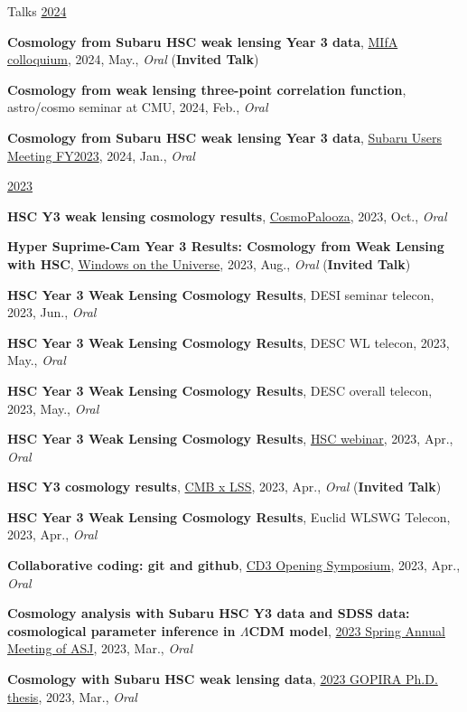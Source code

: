 \begin{rSection}{Talks}
\underline{2024}
\begin{etaremune}
\setcounter{enumi}{38}
\item \textbf{Cosmology from Subaru HSC weak lensing Year 3 data}, \href{https://cse.umn.edu/physics/minnesota-institute-astrophysics-mifa-colloquium}{MIfA colloquium}, 2024, May., \textit{Oral} (\textbf{Invited Talk})
\item \textbf{Cosmology from weak lensing three-point correlation function}, astro/cosmo seminar at CMU, 2024, Feb., \textit{Oral}
\item \textbf{Cosmology from Subaru HSC weak lensing Year 3 data}, \href{https://www.subarutelescope.org/Science/SubaruUM/SubaruUM2023/index.html}{Subaru Users Meeting FY2023}, 2024, Jan., \textit{Oral}
\end{etaremune}

\underline{2023}
\begin{etaremune}
\setcounter{enumi}{35}
\item \textbf{HSC Y3 weak lensing cosmology results}, \href{http://vietnam.in2p3.fr/2023/windows/index.html}{CosmoPalooza}, 2023, Oct., \textit{Oral}
\item \textbf{Hyper Suprime-Cam Year 3 Results: Cosmology from Weak Lensing with HSC}, \href{http://vietnam.in2p3.fr/2023/windows/index.html}{Windows on the Universe}, 2023, Aug., \textit{Oral} (\textbf{Invited Talk})
\item \textbf{HSC Year 3 Weak Lensing Cosmology Results}, DESI seminar telecon, 2023, Jun., \textit{Oral}
\item \textbf{HSC Year 3 Weak Lensing Cosmology Results}, DESC WL telecon, 2023, May., \textit{Oral}
\item \textbf{HSC Year 3 Weak Lensing Cosmology Results}, DESC overall telecon, 2023, May., \textit{Oral}
\item \textbf{HSC Year 3 Weak Lensing Cosmology Results}, \href{https://hsc-release.mtk.nao.ac.jp/doc/index.php/wly3/}{HSC webinar}, 2023, Apr., \textit{Oral}
\item \textbf{HSC Y3 cosmology results}, \href{https://www2.yukawa.kyoto-u.ac.jp/~cmb-lss/index.php}{CMB x LSS}, 2023, Apr., \textit{Oral} (\textbf{Invited Talk})
\item \textbf{HSC Year 3 Weak Lensing Cosmology Results}, Euclid WLSWG Telecon, 2023, Apr., \textit{Oral}
\item \textbf{Collaborative coding: git and github}, \href{https://cd3.ipmu.jp/opening/}{CD3 Opening Symposium}, 2023, Apr., \textit{Oral}
\item \textbf{Cosmology analysis with Subaru HSC Y3 data and SDSS data: cosmological parameter inference in $\Lambda$CDM model}, \href{https://www.asj.or.jp/nenkai/archive/2023a/pdf/U20a.pdf}{2023 Spring Annual Meeting of ASJ}, 2023, Mar., \textit{Oral}
\item \textbf{Cosmology with Subaru HSC weak lensing data}, \href{http://gopira.jp/Dthesis2022/program.html}{2023 GOPIRA Ph.D. thesis}, 2023, Mar., \textit{Oral}
\end{etaremune}


\end{rSection}
